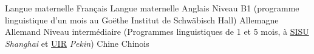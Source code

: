 \begin{cvhonors}

  \cvhonor
    {Langue maternelle} %
    {} %
    {} %
    {Français} %
  \cvhonor
    {Langue maternelle} %
    {} %
    {} %
    {Anglais} %
  \cvhonor
    {Niveau B1} %
    { (programme linguistique d'un mois au Goëthe Institut de Schwäbisch Hall)} %
    {Allemagne} %
    {Allemand} %
  \cvhonor
    {Niveau intermédiaire} %
    { (Programmes linguistiques de 1 et 5 mois, à \href{http://en.shisu.edu.cn/}{SISU} \textit{Shanghai} et \href{https://www.uir.cn/english/}{UIR} \textit{Pekin}) } %
    {Chine} %
    {Chinois} %

\end{cvhonors}